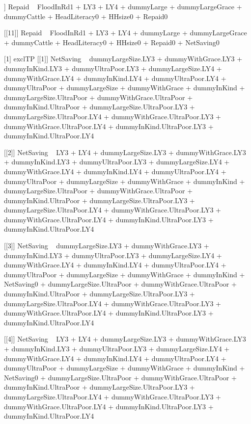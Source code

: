 \begin{Schunk}
\begin{Soutput}
[[10]]
Repaid ~ FloodInRd1 + LY3 + LY4 + dummyLarge + dummyLargeGrace + 
    dummyCattle + HeadLiteracy0 + HHsize0 + Repaid0

[[11]]
Repaid ~ FloodInRd1 + LY3 + LY4 + dummyLarge + dummyLargeGrace + 
    dummyCattle + HeadLiteracy0 + HHsize0 + Repaid0 + NetSaving0

[1] exclTP
[[1]]
NetSaving ~ dummyLargeSize.LY3 + dummyWithGrace.LY3 + dummyInKind.LY3 + 
    dummyUltraPoor.LY3 + dummyLargeSize.LY4 + dummyWithGrace.LY4 + 
    dummyInKind.LY4 + dummyUltraPoor.LY4 + dummyUltraPoor + dummyLargeSize + 
    dummyWithGrace + dummyInKind + dummyLargeSize.UltraPoor + 
    dummyWithGrace.UltraPoor + dummyInKind.UltraPoor + dummyLargeSize.UltraPoor.LY3 + 
    dummyLargeSize.UltraPoor.LY4 + dummyWithGrace.UltraPoor.LY3 + 
    dummyWithGrace.UltraPoor.LY4 + dummyInKind.UltraPoor.LY3 + 
    dummyInKind.UltraPoor.LY4

[[2]]
NetSaving ~ LY3 + LY4 + dummyLargeSize.LY3 + dummyWithGrace.LY3 + 
    dummyInKind.LY3 + dummyUltraPoor.LY3 + dummyLargeSize.LY4 + 
    dummyWithGrace.LY4 + dummyInKind.LY4 + dummyUltraPoor.LY4 + 
    dummyUltraPoor + dummyLargeSize + dummyWithGrace + dummyInKind + 
    dummyLargeSize.UltraPoor + dummyWithGrace.UltraPoor + dummyInKind.UltraPoor + 
    dummyLargeSize.UltraPoor.LY3 + dummyLargeSize.UltraPoor.LY4 + 
    dummyWithGrace.UltraPoor.LY3 + dummyWithGrace.UltraPoor.LY4 + 
    dummyInKind.UltraPoor.LY3 + dummyInKind.UltraPoor.LY4

[[3]]
NetSaving ~ dummyLargeSize.LY3 + dummyWithGrace.LY3 + dummyInKind.LY3 + 
    dummyUltraPoor.LY3 + dummyLargeSize.LY4 + dummyWithGrace.LY4 + 
    dummyInKind.LY4 + dummyUltraPoor.LY4 + dummyUltraPoor + dummyLargeSize + 
    dummyWithGrace + dummyInKind + NetSaving0 + dummyLargeSize.UltraPoor + 
    dummyWithGrace.UltraPoor + dummyInKind.UltraPoor + dummyLargeSize.UltraPoor.LY3 + 
    dummyLargeSize.UltraPoor.LY4 + dummyWithGrace.UltraPoor.LY3 + 
    dummyWithGrace.UltraPoor.LY4 + dummyInKind.UltraPoor.LY3 + 
    dummyInKind.UltraPoor.LY4

[[4]]
NetSaving ~ LY3 + LY4 + dummyLargeSize.LY3 + dummyWithGrace.LY3 + 
    dummyInKind.LY3 + dummyUltraPoor.LY3 + dummyLargeSize.LY4 + 
    dummyWithGrace.LY4 + dummyInKind.LY4 + dummyUltraPoor.LY4 + 
    dummyUltraPoor + dummyLargeSize + dummyWithGrace + dummyInKind + 
    NetSaving0 + dummyLargeSize.UltraPoor + dummyWithGrace.UltraPoor + 
    dummyInKind.UltraPoor + dummyLargeSize.UltraPoor.LY3 + dummyLargeSize.UltraPoor.LY4 + 
    dummyWithGrace.UltraPoor.LY3 + dummyWithGrace.UltraPoor.LY4 + 
    dummyInKind.UltraPoor.LY3 + dummyInKind.UltraPoor.LY4


\end{Soutput}
\end{Schunk}
